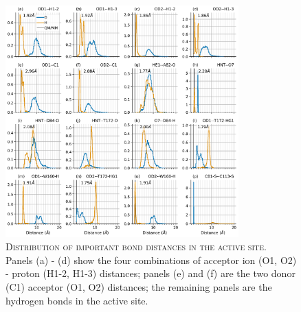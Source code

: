\begin{figure}
    \centering
    \includegraphics[width=0.8\textwidth]{chapters/aadh/figures/bond_distances_dist.pdf}
    \caption[Distribution of important bond distances in the active site]{\textsc{Distribution of important bond distances in the active site}. Panels (a) - (d) show the four combinations of acceptor ion (O1, O2) - proton (H1-2, H1-3) distances; panels (e) and (f) are the two donor (C1) acceptor (O1, O2) distances; the remaining panels are the hydrogen bonds in the active site.}
    \label{fig:bond_dist}
\end{figure}


